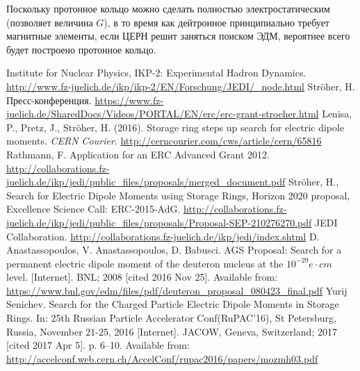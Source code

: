 \documentclass{extarticle}
\begin{document}
Поскольку протонное кольцо можно сделать полностью электростатическим (позволяет величина $G$), в то время как дейтронное принципиально требует магнитные элементы, если ЦЕРН решит заняться поиском ЭДМ, вероятнее всего будет построено протонное кольцо.
\begin{thebibliography}{0}
	Institute for Nuclear Physics, IKP-2: Experimental Hadron Dynamics. \url{http://www.fz-juelich.de/ikp/ikp-2/EN/Forschung/JEDI/_node.html}
	Str\"oher, H. Пресс-конференция. \url{https://www.fz-juelich.de/SharedDocs/Videos/PORTAL/EN/erc/erc-grant-stroeher.html}
	Lenisa, P., Pretz, J., Str\"oher, H. (2016). Storage ring steps up search for electric dipole moments. \textit{CERN Courier}. \url{http://cerncourier.com/cws/article/cern/65816}
	Rathmann, F. Application for an ERC Advanced Grant 2012. \url{http://collaborations.fz-juelich.de/ikp/jedi/public_files/proposals/merged_document.pdf}
	Str\"oher, H., Search for Electric Dipole Moments using Storage Rings, Horizon 2020 proposal, Excellence Science Call: ERC-2015-AdG. \url{http://collaborations.fz-juelich.de/ikp/jedi/public_files/proposals/Proposal-SEP-210276270.pdf}
	JEDI Collaboration. \url{http://collaborations.fz-juelich.de/ikp/jedi/index.shtml}
	D. Anastassopoulos, V. Anastassopoulos, D. Babusci. AGS Proposal: Search for a permanent electric dipole moment of the deuteron nucleus at the $10^{-29} e\cdot cm$ level. [Internet]. BNL; 2008 [cited 2016 Nov 25]. Available from: \url{https://www.bnl.gov/edm/files/pdf/deuteron_proposal_080423_final.pdf}
	Yurij Senichev. Search for the Charged Particle Electric Dipole Moments in Storage Rings. In: 25th Russian Particle Accelerator Conf(RuPAC’16), St Petersburg, Russia, November 21-25, 2016 [Internet]. JACOW, Geneva, Switzerland; 2017 [cited 2017 Apr 5]. p. 6–10. Available from: \url{http://accelconf.web.cern.ch/AccelConf/rupac2016/papers/mozmh03.pdf}
	
\end{thebibliography}
\end{document}
